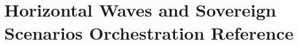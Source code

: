 \documentclass[11pt,a4paper]{book}
\newif\ifusebiblatex
\DeclareRobustCommand{\_}{\ifmmode\text{\symbol{95}}\else\symbol{95}\allowbreak\fi}
\theoremstyle{plain}
\theoremstyle{definition}
\begin{document}
\part{Horizontal Waves and Sovereign Scenarios Orchestration Reference}








\backmatter
\ifusebiblatex
    \printbibliography[heading=bibintoc]
\else
    \cleardoublepage
    
    
\fi
\end{document}
